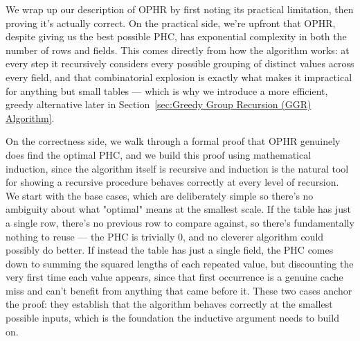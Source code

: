 \documentclass[manuscript,review]{acmart}
\begin{document}
We wrap up our description of OPHR by first noting its practical limitation, then proving it's actually correct.
On the practical side, we're upfront that OPHR, despite giving us the best possible PHC, has exponential complexity in both the number of rows and fields. This comes directly from how the algorithm works: at every step it recursively considers every possible grouping of distinct values across every field, and that combinatorial explosion is exactly what makes it impractical for anything but small tables — which is why we introduce a more efficient, greedy alternative later in Section~\ref{sec:Greedy Group Recursion (GGR) Algorithm}.

On the correctness side, we walk through a formal proof that OPHR genuinely does find the optimal PHC, and we build this proof using mathematical induction, since the algorithm itself is recursive and induction is the natural tool for showing a recursive procedure behaves correctly at every level of recursion. We start with the base cases, which are deliberately simple so there's no ambiguity about what "optimal" means at the smallest scale. If the table has just a single row, there's no previous row to compare against, so there's fundamentally nothing to reuse — the PHC is trivially 0, and no cleverer algorithm could possibly do better. If instead the table has just a single field, the PHC comes down to summing the squared lengths of each repeated value, but discounting the very first time each value appears, since that first occurrence is a genuine cache miss and can't benefit from anything that came before it. These two cases anchor the proof: they establish that the algorithm behaves correctly at the smallest possible inputs, which is the foundation the inductive argument needs to build on. 
\end{document}
